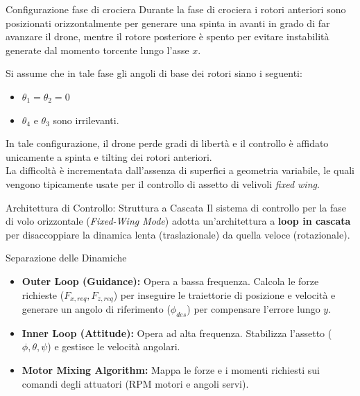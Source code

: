 \documentclass[aspectratio=169]{beamer} %
\begin{document}
\begin{frame}{Configurazione fase di crociera}
    Durante la fase di crociera i rotori anteriori sono posizionati orizzontalmente per generare una spinta in avanti in grado di far avanzare il drone,
    mentre il rotore posteriore è spento per evitare instabilità generate dal momento torcente lungo l'asse $x$.
    
    \vspace{0.3cm}
    Si assume che in tale fase gli angoli di base dei rotori siano i seguenti:
    \begin{itemize}
        \item $\theta_1 = \theta_2 = 0$
        \item $\theta_4$ e $\theta_3$ sono irrilevanti.
    \end{itemize}
    In tale configurazione, il drone perde gradi di libertà e il controllo è affidato unicamente a spinta e tilting dei rotori anteriori.
    \vspace{0.2cm}
    \\La difficoltà è incrementata dall'assenza di superfici a geometria variabile, le quali vengono tipicamente usate per il controllo di assetto di velivoli \textit{fixed wing}.
\end{frame}

\begin{frame}{Architettura di Controllo: Struttura a Cascata}
    Il sistema di controllo per la fase di volo orizzontale (\textit{Fixed-Wing Mode}) adotta un'architettura a \textbf{loop in cascata} per disaccoppiare la dinamica lenta (traslazionale) da quella veloce (rotazionale).

    \begin{block}{Separazione delle Dinamiche}
        \begin{itemize}
            \item \textbf{Outer Loop (Guidance):} Opera a bassa frequenza. Calcola le forze richieste ($F_{x,req}, F_{z,req}$) per inseguire le traiettorie di posizione e velocità e generare un angolo di riferimento ($\phi_{des}$) per compensare l'errore lungo $y$.
            \item \textbf{Inner Loop (Attitude):} Opera ad alta frequenza. Stabilizza l'assetto ($\phi, \theta, \psi$) e gestisce le velocità angolari.
            \item \textbf{Motor Mixing Algorithm:} Mappa le forze e i momenti richiesti sui comandi degli attuatori (RPM motori e angoli servi).
        \end{itemize}
    \end{block}
    
\end{frame}
\end{document}
